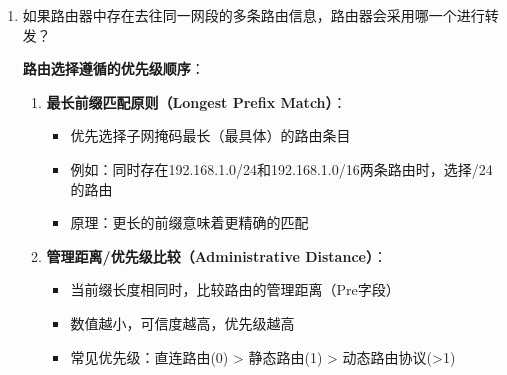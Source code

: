 \documentclass[a4paper]{article}
\begin{document}
\begin{enumerate}
\begin{myquote}[colback=green!5!white,colframe=green!75!black,title=回答]
\begin{enumerate}
        \item \textbf{R2上的静态路由}：
        \begin{itemize}
            \item 配置命令：\texttt{ip route-static 192.168.1.0 24 192.168.2.1}
            \item 路由含义：告诉R2，当需要访问192.168.1.0/24网段时，将数据包发送给下一跳路由器192.168.2.1（即R1在中间网段的接口）
            \item 作用：实现从PC2到PC1方向的数据包转发（回程路由）
        \end{itemize}
    \end{enumerate}
    
    \textbf{双向通信原理}：
    \begin{itemize}
        \item 这两条路由相互配合，形成完整的双向通信路径
        \item 缺少任何一条路由都会导致单向通信失败
        \item 体现了网络通信中"有来有回"的基本原则
    \end{itemize}
    \end{myquote}

    \item 如果路由器中存在去往同一网段的多条路由信息，路由器会采用哪一个进行转发？

    \begin{myquote}[colback=yellow!5!white,colframe=yellow!75!black,title=回答]
    \textbf{路由选择遵循的优先级顺序}：
    
    \begin{enumerate}
        \item \textbf{最长前缀匹配原则（Longest Prefix Match）}：
        \begin{itemize}
            \item 优先选择子网掩码最长（最具体）的路由条目
            \item 例如：同时存在192.168.1.0/24和192.168.1.0/16两条路由时，选择/24的路由
            \item 原理：更长的前缀意味着更精确的匹配
        \end{itemize}
        
        \item \textbf{管理距离/优先级比较（Administrative Distance）}：
        \begin{itemize}
            \item 当前缀长度相同时，比较路由的管理距离（Pre字段）
            \item 数值越小，可信度越高，优先级越高
            \item 常见优先级：直连路由(0) > 静态路由(1) > 动态路由协议(>1)
        \end{itemize}
        

\end{enumerate}
\end{myquote}
\end{enumerate}
\end{document}
